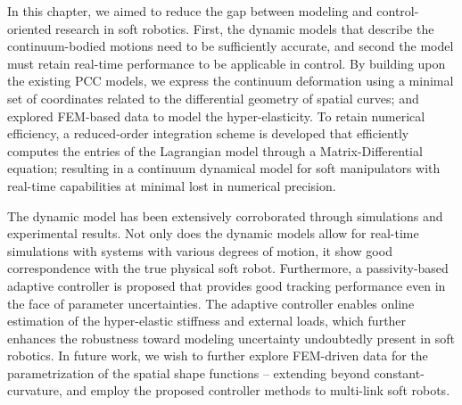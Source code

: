 \noindent In this chapter, we aimed to reduce the gap between modeling and control-oriented research in soft robotics. First, the dynamic models that describe the continuum-bodied motions need to be sufficiently accurate, and second the model must retain real-time performance to be applicable in control. By building upon the existing PCC models, we express the continuum deformation using a minimal set of coordinates related to the differential geometry of spatial curves; and explored FEM-based data to model the hyper-elasticity. To retain numerical efficiency, a reduced-order integration scheme is developed that efficiently computes the entries of the Lagrangian model through a Matrix-Differential equation; resulting in a continuum dynamical model for soft manipulators with real-time capabilities at minimal lost in numerical precision. 

The dynamic model has been extensively corroborated through simulations and experimental results. Not only does the dynamic models allow for real-time simulations with systems with various degrees of motion, it show good correspondence with the true physical soft robot. Furthermore, a passivity-based adaptive controller is proposed that provides good tracking performance even in the face of parameter uncertainties. The adaptive controller enables online estimation of the hyper-elastic stiffness and external loads, which further enhances the robustness toward modeling uncertainty undoubtedly present in soft robotics. In future work, we wish to further explore FEM-driven data for the parametrization of the spatial shape functions -- extending beyond constant-curvature, and employ the proposed controller methods to multi-link soft robots.
